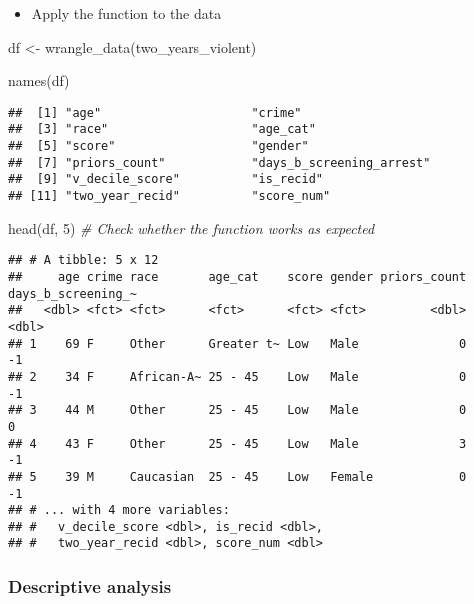 \documentclass[
]{book}
\newenvironment{Shaded}{\begin{snugshade}}{\end{snugshade}}
\newcommand{\CommentTok}[1]{\textcolor[rgb]{0.56,0.35,0.01}{\textit{#1}}}
\newcommand{\DecValTok}[1]{\textcolor[rgb]{0.00,0.00,0.81}{#1}}
\newcommand{\FunctionTok}[1]{\textcolor[rgb]{0.00,0.00,0.00}{#1}}
\newcommand{\NormalTok}[1]{#1}
\newcommand{\OtherTok}[1]{\textcolor[rgb]{0.56,0.35,0.01}{#1}}
\providecommand{\tightlist}{%
  \setlength{\itemsep}{0pt}\setlength{\parskip}{0pt}}
\begin{document}
\begin{itemize}
\tightlist
\item
  Apply the function to the data
\end{itemize}

\begin{Shaded}
\begin{Highlighting}[]
\NormalTok{df }\OtherTok{\textless{}{-}} \FunctionTok{wrangle\_data}\NormalTok{(two\_years\_violent)}

\FunctionTok{names}\NormalTok{(df)}
\end{Highlighting}
\end{Shaded}

\begin{verbatim}
##  [1] "age"                     "crime"                  
##  [3] "race"                    "age_cat"                
##  [5] "score"                   "gender"                 
##  [7] "priors_count"            "days_b_screening_arrest"
##  [9] "v_decile_score"          "is_recid"               
## [11] "two_year_recid"          "score_num"
\end{verbatim}

\begin{Shaded}
\begin{Highlighting}[]
\FunctionTok{head}\NormalTok{(df, }\DecValTok{5}\NormalTok{) }\CommentTok{\# Check whether the function works as expected }
\end{Highlighting}
\end{Shaded}

\begin{verbatim}
## # A tibble: 5 x 12
##     age crime race       age_cat    score gender priors_count days_b_screening_~
##   <dbl> <fct> <fct>      <fct>      <fct> <fct>         <dbl>              <dbl>
## 1    69 F     Other      Greater t~ Low   Male              0                 -1
## 2    34 F     African-A~ 25 - 45    Low   Male              0                 -1
## 3    44 M     Other      25 - 45    Low   Male              0                  0
## 4    43 F     Other      25 - 45    Low   Male              3                 -1
## 5    39 M     Caucasian  25 - 45    Low   Female            0                 -1
## # ... with 4 more variables:
## #   v_decile_score <dbl>, is_recid <dbl>,
## #   two_year_recid <dbl>, score_num <dbl>
\end{verbatim}

\hypertarget{descriptive-analysis-1}{%
\subsubsection{Descriptive analysis}\label{descriptive-analysis-1}}
\end{document}
